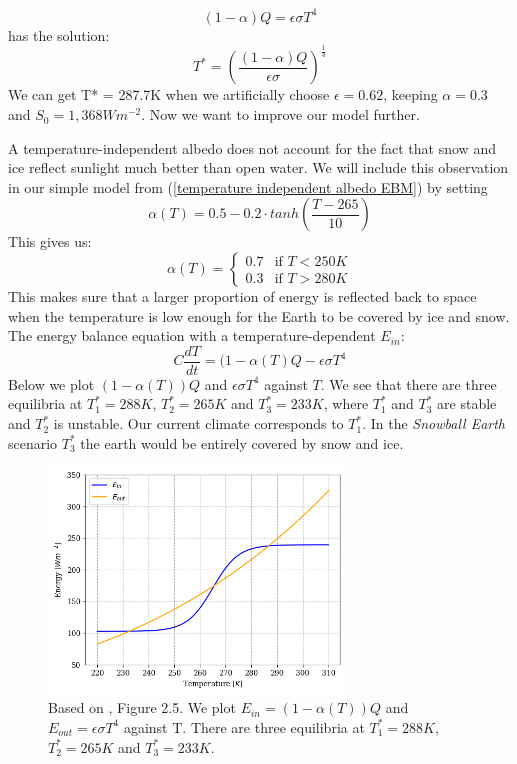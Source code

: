 \documentclass[%
thesis=student,%
coverpage=false,%
titlepage=false,%
headmarks=true, %
english,%
font=libertine, %
math=newpxtx, %
BCOR=5mm,%
coverBCOR=11mm%
]{tumbook}
\begin{document}
\begin{equation}
    (1-\alpha)Q = \epsilon \sigma T^4
\end{equation}
has the solution: 
\begin{equation}
    T^* = (\frac{(1-\alpha)Q}{\epsilon\sigma})^\frac{1}{4}
\end{equation}
We can get T* = 287.7K when we artificially choose $\epsilon = 0.62$, keeping $\alpha = 0.3$ and $S_{0} = 1,368 Wm^{-2}$. 
Now we want to improve our model further. 

A temperature-independent albedo does not account for the fact that snow and ice reflect sunlight much better than open water. We will include this observation in our simple model from (\ref{temperature independent albedo EBM}) by setting 
\begin{equation}
    \alpha (T) = 0.5 - 0.2 \cdot tanh(\frac{T - 265}{10})
\end{equation}
This gives us: 
\[
\alpha(T) =
\begin{cases}
0.7 & \text{if } T < 250K \\
0.3 & \text{if } T > 280K
\end{cases}
\]
This makes sure that a larger proportion of energy is reflected back to space when the temperature is low enough for the Earth to be covered by ice and snow.
The energy balance equation with a temperature-dependent $E_{in}$: 
\begin{equation}
 C\frac{dT}{dt} = (1-\alpha(T)Q - \epsilon\sigma T^4
 \label{simple EBM}
\end{equation}
Below we plot $(1-\alpha(T))Q$ and $\epsilon\sigma T^4$ against $T$. We see that there are three equilibria at $T_{1}^* = 288K$, $T_{2}^* = 265K$ and $T_{3}^* = 233K$, where $T_{1}^*$ and $T_{3}^*$ are stable and $T_{2}^*$ is unstable. Our current climate corresponds to $T_{1}^*$. In the \textit{Snowball Earth} scenario $T_{3}^*$ the earth would be entirely covered by snow and ice. 

\begin{figure}
    \centering
    \includegraphics[width=0.7\textwidth]{bachelor-thesis/figures/se_multiple_equilibria.png}
    \caption{Based on \cite{Kaper:2013}, Figure 2.5. We plot $E_{in} = (1-\alpha(T))Q$ and $E_{out} = \epsilon\sigma T^4$ against T. There are three equilibria at $T_{1}^* = 288K$, $T_{2}^* = 265K$ and $T_{3}^* = 233K$.}
    \label{fig:enter-label}
\end{figure}
\end{document}
